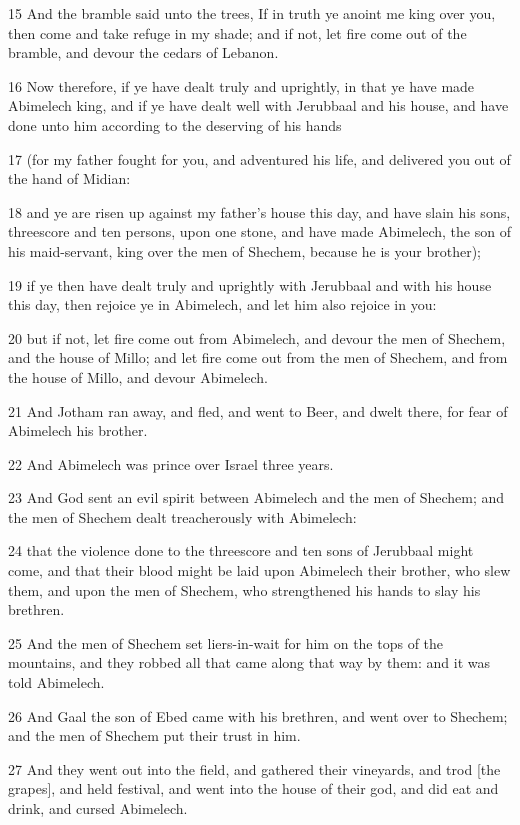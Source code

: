 \par 15 And the bramble said unto the trees, If in truth ye anoint me king over you, then come and take refuge in my shade; and if not, let fire come out of the bramble, and devour the cedars of Lebanon.
\par 16 Now therefore, if ye have dealt truly and uprightly, in that ye have made Abimelech king, and if ye have dealt well with Jerubbaal and his house, and have done unto him according to the deserving of his hands
\par 17 (for my father fought for you, and adventured his life, and delivered you out of the hand of Midian:
\par 18 and ye are risen up against my father's house this day, and have slain his sons, threescore and ten persons, upon one stone, and have made Abimelech, the son of his maid-servant, king over the men of Shechem, because he is your brother);
\par 19 if ye then have dealt truly and uprightly with Jerubbaal and with his house this day, then rejoice ye in Abimelech, and let him also rejoice in you:
\par 20 but if not, let fire come out from Abimelech, and devour the men of Shechem, and the house of Millo; and let fire come out from the men of Shechem, and from the house of Millo, and devour Abimelech.
\par 21 And Jotham ran away, and fled, and went to Beer, and dwelt there, for fear of Abimelech his brother.
\par 22 And Abimelech was prince over Israel three years.
\par 23 And God sent an evil spirit between Abimelech and the men of Shechem; and the men of Shechem dealt treacherously with Abimelech:
\par 24 that the violence done to the threescore and ten sons of Jerubbaal might come, and that their blood might be laid upon Abimelech their brother, who slew them, and upon the men of Shechem, who strengthened his hands to slay his brethren.
\par 25 And the men of Shechem set liers-in-wait for him on the tops of the mountains, and they robbed all that came along that way by them: and it was told Abimelech.
\par 26 And Gaal the son of Ebed came with his brethren, and went over to Shechem; and the men of Shechem put their trust in him.
\par 27 And they went out into the field, and gathered their vineyards, and trod [the grapes], and held festival, and went into the house of their god, and did eat and drink, and cursed Abimelech.

